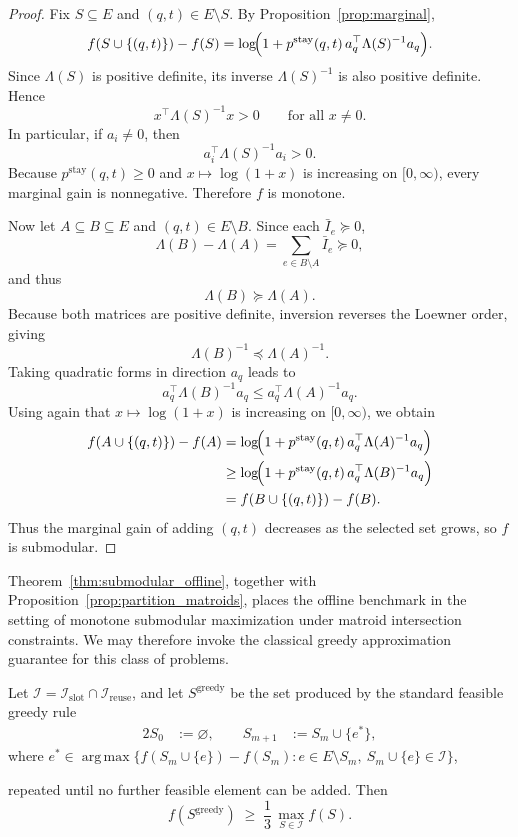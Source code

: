 \documentclass{article}
\begin{document}
\begin{proof}
Fix $S\subseteq E$ and $(q,t)\in E\setminus S$. By
Proposition~\ref{prop:marginal},
\[
f(S\cup\{(q,t)\}) - f(S)
=
\log\!\Bigl(1 + p^{\text{stay}}(q,t)\, a_q^\top \Lambda(S)^{-1} a_q\Bigr).
\]
Since $\Lambda(S)$ is positive definite, its inverse $\Lambda(S)^{-1}$ is also positive
definite. Hence
\[
x^\top \Lambda(S)^{-1}x > 0
\qquad\text{for all } x\neq 0.
\]
In particular, if $a_i\neq 0$, then
\[
a_i^\top \Lambda(S)^{-1} a_i > 0.
\]
Because $p^{\text{stay}}(q,t)\ge 0$ and $x\mapsto \log(1+x)$ is increasing on
$[0,\infty)$, every marginal gain is nonnegative. Therefore $f$ is monotone.

Now let $A\subseteq B\subseteq E$ and $(q,t)\in E\setminus B$. Since each
$\bar I_e \succeq 0$,
\[
\Lambda(B)-\Lambda(A)
=
\sum_{e\in B\setminus A}\bar I_e
\succeq 0,
\]
and thus
\[
\Lambda(B)\succeq \Lambda(A).
\]
Because both matrices are positive definite, inversion reverses the Loewner order,
giving
\[
\Lambda(B)^{-1} \preceq \Lambda(A)^{-1}.
\]
Taking quadratic forms in direction $a_q$ leads to
\[
a_q^\top \Lambda(B)^{-1} a_q
\le
a_q^\top \Lambda(A)^{-1} a_q.
\]
Using again that $x\mapsto \log(1+x)$ is increasing on $[0,\infty)$, we obtain
\begin{align*}
f(A\cup\{(q,t)\}) - f(A)
&=
\log\!\Bigl(1 + p^{\text{stay}}(q,t)\, a_q^\top \Lambda(A)^{-1} a_q\Bigr)
\\
&\ge
\log\!\Bigl(1 + p^{\text{stay}}(q,t)\, a_q^\top \Lambda(B)^{-1} a_q\Bigr)
\\
&=
f(B\cup\{(q,t)\}) - f(B).
\end{align*}
Thus the marginal gain of adding $(q,t)$ decreases as the selected set grows,
so $f$ is submodular.
\end{proof}

Theorem~\ref{thm:submodular_offline}, together with Proposition~\ref{prop:partition_matroids}, places the offline benchmark in the setting of monotone submodular maximization under matroid intersection constraints. We may therefore invoke the classical greedy approximation guarantee for this class of problems.

\begin{corollary}
\label{cor:offline_greedy}
Let $\mathcal I = \mathcal I_{\text{slot}} \cap \mathcal I_{\text{reuse}}$,
and let $S^{\text{greedy}}$ be the set produced by the standard feasible greedy rule
\begin{alignat*}{2}
S_0 &:= \varnothing, \qquad S_{m+1} &:= S_m \cup \{e^*\},
\end{alignat*}
where $e^* \in \operatorname*{arg\,max}
\bigl\{f(S_m \cup \{e\}) - f(S_m) :
e \in E \setminus S_m,\ S_m \cup \{e\} \in \mathcal{I}\bigr\}$,

repeated until no further feasible element can be added. Then
\[
f(S^{\text{greedy}})
\;\ge\;
\frac{1}{3}\,
\max_{S \in \mathcal I} f(S).
\]
\end{corollary}
\end{document}
